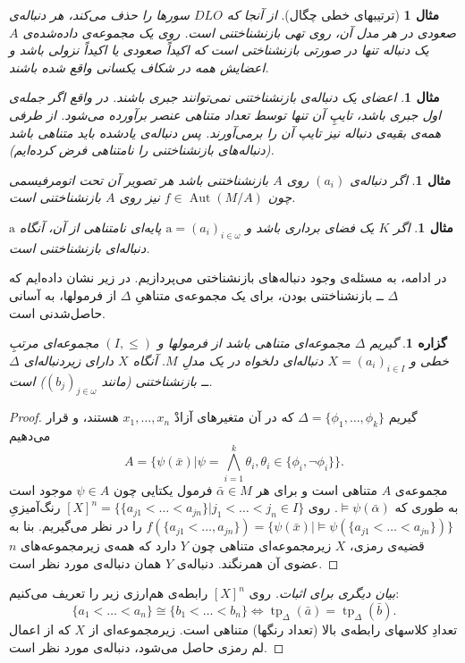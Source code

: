 \documentclass[12pt,a4paper]{report}
\theoremstyle{colorhead}
\newtheorem{mesal}[thm]{مثال}
\newtheorem{prop}[thm]{گزاره}
\DeclareMathOperator{\tp}{tp}
\DeclareMathOperator{\Aut}{Aut}
\begin{document}
\begin{mesal}[ترتیبهای خطی چگال]
از آنجا که
$DLO$
سورها را حذف می‌کند، هر دنباله‌ی صعودی در هر مدل آن، روی
تهی بازنشناختنی است. روی یک مجموعه‌ی داده‌شده‌ی
$A$
یک دنباله تنها در صورتی بازنشناختی است که اکیداً صعودی یا اکیداً نزولی باشد و اعضایش همه در شکاف یکسانی واقع شده‌ باشند. 
\end{mesal}
\begin{mesal}
اعضای یک دنباله‌ی بازنشناختنی نمی‌توانند جبری باشند. در واقع اگر
جمله‌ی اول جبری باشد، تایپِ آن تنها توسط تعداد متناهی عنصر برآورده می‌شود. از طرفی همه‌ی بقیه‌ی دنباله نیز تایپ آن را برمی‌آورند. پس دنباله‌ی یادشده باید متناهی باشد (دنباله‌های بازنشناختنی را نامتناهی فرض کرده‌ایم).
\end{mesal}
\begin{mesal}
اگر
دنباله‌ی
$(a_i)$
روی
$A$
بازنشناختنی باشد هر تصویر آن تحت اتومرفیسمی چون
\mbox{$f\in \Aut(M/A)$}
نیز روی
$A$
بازنشناختنی است.
\end{mesal}
\begin{mesal}
اگر
$K$
یک فضای برداری باشد و 
$\mathrm{a}=(a_i)_{i\in \omega}$
پایه‌ای نامتناهی از آن، آنگاه 
$\mathrm{a}$
دنباله‌ای بازنشناختنی است. 
\end{mesal}
در ادامه، به مسئله‌ی وجود دنباله‌های بازنشناختی می‌پردازیم. در زیر نشان داده‌ایم که 
$\Delta$ ــ
بازنشناختنی بودن،‌ برای یک مجموعه‌ی متناهیِ
$\Delta$
از فرمولها، به آسانی حاصل‌شدنی است.  
\begin{prop}
\label{indis1}
گیریم 
$\Delta$
مجموعه‌ای متناهی باشد از فرمولها و 
$(I,\leq)$
مجموعه‌ای مرتبِ خطی و 
$X=(a_i)_{i\in I}$
دنباله‌ای دلخواه در یک مدلِ
$M$.
آنگاه
$X$
دارای زیردنباله‌ای
$\Delta$
ــ
بازنشناختنی 
(مانند
$(b_j)_{j\in \omega}$)
است. 
\end{prop}
\begin{proof}
گیریم
$\Delta=\{\phi_1,\ldots,\phi_k\}$
که در آن متغیرهای آزادْ
$x_1,\ldots,x_n$
هستند،
و قرار می‌دهیم
\[
A=\{\psi(\bar{x})| \psi=\bigwedge_{i=1}^k \theta_i, \theta_i\in \{\phi_i,\neg\phi_i\}\}.
\]
مجموعه‌ی
$A$
متناهی است و برای هر
$\bar{\alpha}\in M$
فرمول یکتایی چون
$\psi\in A$
موجود است به طوری که
$\models \psi(\bar{\alpha})$.
روی
$[X]^n=\{\{a_{j1}<\ldots<a_{jn}\}|j_1<\ldots<j_n\in I\}$
رنگ‌آمیزیِ
$f(\{a_{j1}<\ldots,a_{jn}\})=\{\psi(\bar{x})|\models \psi(\{a_{j1}<\ldots<a_{jn}\})\}$
را در نظر می‌گیریم. بنا به قضیه‌ی رمزی،
$X$
زیرمجموعه‌ای متناهی چون
$Y$
دارد که همه‌ی زیرمجموعه‌های
$n$
عضوی آن همرنگند. دنباله‌ی
$Y$
همان دنباله‌ی مورد نظر است. 
\end{proof}
\begin{proof}[بیان دیگری برای اثبات]
روی
$[X]^n$
رابطه‌ی هم‌ارزی زیر را تعریف می‌کنیم:
\[
\{a_1<\ldots<a_n\}\cong \{b_1<\ldots<b_n\}\Leftrightarrow \tp_\Delta(\bar{a})=\tp_\Delta(\bar{b}).
\]
تعدادِ کلاسهای رابطه‌ی بالا (تعداد رنگها) متناهی است. زیرمجموعه‌ای از
$X$
که از اعمال لم رمزی حاصل می‌شود، دنباله‌ی مورد نظر است. 
\end{proof}
\end{document}
